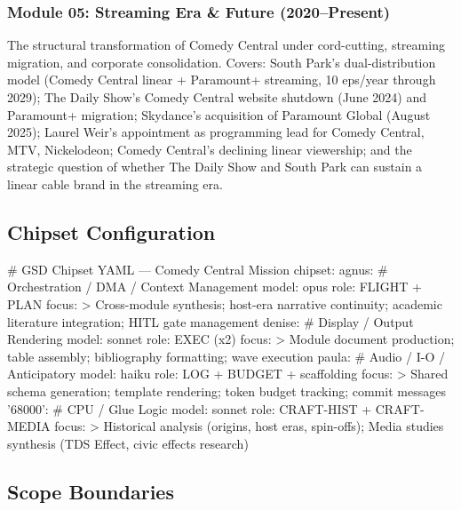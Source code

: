\documentclass[11pt,letterpaper]{article}
\begin{document}
\subsubsection{Module 05: Streaming Era \& Future (2020--Present)}
The structural transformation of Comedy Central under cord-cutting, streaming migration, and corporate consolidation. Covers: South Park's dual-distribution model (Comedy Central linear + Paramount+ streaming, 10 eps/year through 2029); The Daily Show's Comedy Central website shutdown (June 2024) and Paramount+ migration; Skydance's acquisition of Paramount Global (August 2025); Laurel Weir's appointment as programming lead for Comedy Central, MTV, Nickelodeon; Comedy Central's declining linear viewership; and the strategic question of whether The Daily Show and South Park can sustain a linear cable brand in the streaming era.

\subsection{Chipset Configuration}

\begin{asciibox}
# GSD Chipset YAML — Comedy Central Mission
chipset:
  agnus:          # Orchestration / DMA / Context Management
    model: opus
    role: FLIGHT + PLAN
    focus: >
      Cross-module synthesis; host-era narrative continuity;
      academic literature integration; HITL gate management
  denise:         # Display / Output Rendering
    model: sonnet
    role: EXEC (x2)
    focus: >
      Module document production; table assembly;
      bibliography formatting; wave execution
  paula:          # Audio / I-O / Anticipatory
    model: haiku
    role: LOG + BUDGET + scaffolding
    focus: >
      Shared schema generation; template rendering;
      token budget tracking; commit messages
  '68000':        # CPU / Glue Logic
    model: sonnet
    role: CRAFT-HIST + CRAFT-MEDIA
    focus: >
      Historical analysis (origins, host eras, spin-offs);
      Media studies synthesis (TDS Effect, civic effects research)
\end{asciibox}

\subsection{Scope Boundaries}
\end{document}
